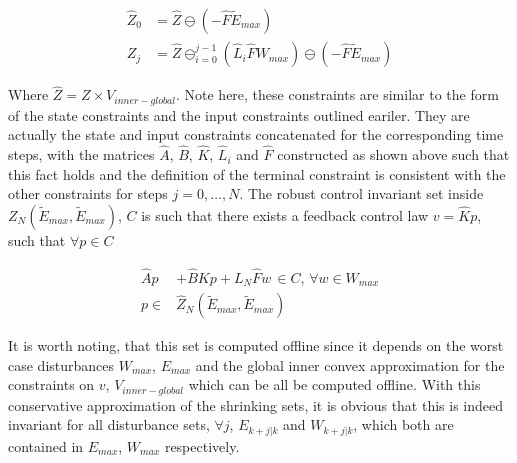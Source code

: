 \begin{subequations}
\begin{align}
\hat{Z}_0 &=\hat{Z}\ominus(-\hat{F}\tilde{E}_{max}) \\
Z_{j} &= \hat{Z} \ominus_{i=0}^{j-1}(\hat{L}_i\hat{F}W_{max})\ominus (-\hat{F}\tilde{E}_{max})
\end{align}
\end{subequations}

Where $\hat{Z}=Z\times V_{inner-global}$. Note here, these constraints are similar to the form of the state constraints and the input constraints outlined eariler. They are actually the state and input constraints concatenated for the corresponding time steps, with the matrices $\hat{A}$, $\hat{B}$, $\hat{K}$, $\hat{L}_i$ and $\hat{F}$ constructed as shown above such that this fact holds and the definition of the terminal constraint is consistent with the other constraints for steps $j=0,\dotsc,N$.
 The robust control invariant set inside $Z_N(\tilde{E}_{max},\tilde{E}_{max})$, $C$ is such that there exists a feedback control law $v=\hat{K}p$, such that $\forall p\in C$


\begin{subequations}
\begin{align}
\label{eq:C_def}
\hat{A}p &+ \hat{B}Kp+L_N \hat{F}w \, \in C,\, \forall w \in W_{max} \\
p \in &\hat{Z}_N(\tilde{E}_{max}, \tilde{E}_{max})
\end{align}
\end{subequations}

It is worth noting, that this set is computed offline since it depends on the worst case disturbances $W_{max}$, $E_{max}$ and the global inner convex approximation for the constraints on $v$, $V_{inner-global}$ which can be all be computed offline. With this conservative approximation of the shrinking sets, it is obvious that this is indeed invariant for all disturbance sets, $\forall j$, $E_{k+j|k}$ and $W_{k+j|k}$, which both are contained in $E_{max}$, $W_{max}$ respectively. 


